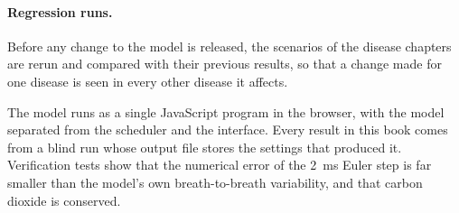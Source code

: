 \paragraph{Regression runs.} Before any change to the model is released, the scenarios of the disease chapters are rerun and compared with their previous results, so that a change made for one disease is seen in every other disease it affects.

\begin{summarybox}
The model runs as a single JavaScript program in the browser, with the model separated from the scheduler and the interface. Every result in this book comes from a blind run whose output file stores the settings that produced it. Verification tests show that the numerical error of the \SI{2}{\milli\second} Euler step is far smaller than the model's own breath-to-breath variability, and that carbon dioxide is conserved.
\end{summarybox}
